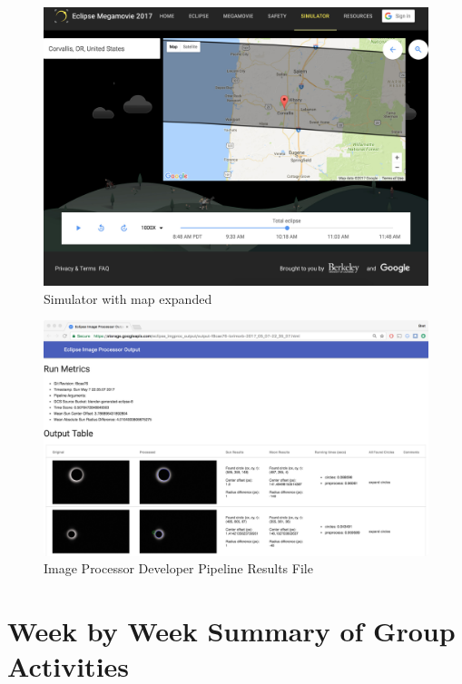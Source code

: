 \documentclass[10pt, onecolumn, draftclsnofoot, letterpaper, compsoc]{IEEEtran}
\begin{document}
\begin{figure}[!h]
	\begin{center}
			\includegraphics[width=\textwidth]{sim_map.eps}
		\caption{Simulator with map expanded}
	\end{center}
\end{figure}
\newpage

\begin{figure}[!h]
    \begin{center}
            \includegraphics[width=\textwidth]{imgproc.eps}
        \caption{Image Processor Developer Pipeline Results File}
    \end{center}
\end{figure}
\newpage


\newpage
\section{Week by Week Summary of Group Activities}
\end{document}
